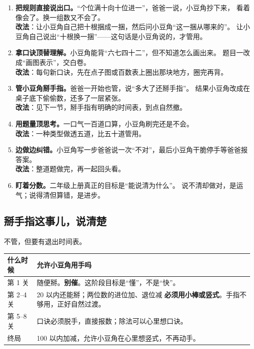 \begin{pitbox}
\begin{enumerate}[label=\arabic*、]
  \item \textbf{把规则直接说出口。}“个位满十向十位进一”，爸爸一说，小豆角抄下来，
        看着像会了。换一组数又不会了。\\
        \textbf{改法}：让小豆角自己把十根捆成一捆，然后问小豆角“这一捆从哪来的”。
        让小豆角自己说出“十根换一捆”——这句话是小豆角说的，才管用。
  \item \textbf{拿口诀顶替理解。}小豆角能背“六七四十二”，但不知道怎么画出来。
        题目一改成“画图表示”，交白卷。\\
        \textbf{改法}：每句新口诀，先在点子图或百数表上圈出那块地方，圈完再背。
  \item \textbf{管小豆角掰手指。}爸爸一开始也管，说“多大了还掰手指”。
        结果小豆角改成在桌子底下偷偷数，还多了一层紧张。\\
        \textbf{改法}：见下一节，掰手指有明确的时间表，到点自然撤。
  \item \textbf{用题量顶思考。}一口气一百道口算，小豆角刷完还是不会。\\
        \textbf{改法}：一种类型做透五道，比五十道管用。
  \item \textbf{边做边纠错。}小豆角写一步爸爸说一次“不对”，最后小豆角干脆停手等爸爸报答案。\\
        \textbf{改法}：整道题做完，再一起回头看。
  \item \textbf{盯着分数。}二年级上册真正的目标是“能说清为什么”。
        说不清却做对，是运气；说得清但算错，是进步。
\end{enumerate}
\end{pitbox}

\subsection{掰手指这事儿，说清楚}

不管，但要有退出时间表。

\begin{center}
\begin{tabularx}{\linewidth}{@{}p{3.6cm}X@{}}
\toprule
\textbf{什么时候} & \textbf{允许小豆角用手吗} \\
\midrule
第 1 关 & 随便掰。\textbf{别催}。这阶段目标是“懂”，不是“快”。\\
第 2--4 关 & 20 以内还能掰；两位数的进位加、退位减
\textbf{必须用小棒或竖式}。手指不够用，正好自然过渡。\\
第 5--8 关 & 口诀必须脱手，直接报数；除法可以心里想口诀。\\
终局 & 100 以内加减，允许小豆角在心里想竖式，不再动手。\\
\bottomrule
\end{tabularx}
\end{center}

